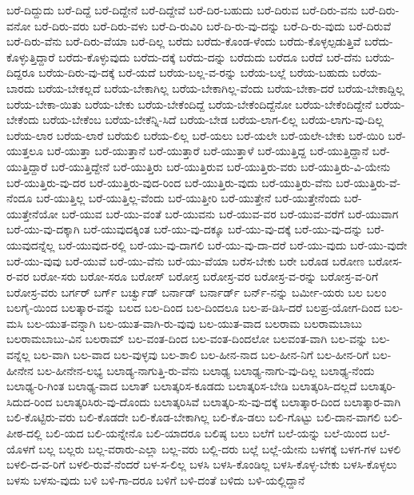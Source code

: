 {ಬರೆ-ದಿದ್ದುದು
ಬರೆ-ದಿದ್ದೆ
ಬರೆ-ದಿದ್ದೇನೆ
ಬರೆ-ದಿದ್ದೇವೆ
ಬರೆ-ದಿರ-ಬಹುದು
ಬರೆ-ದಿರುವ
ಬರೆ-ದಿರು-ವನು
ಬರೆ-ದಿರು-ವನೋ
ಬರೆ-ದಿರು-ವರು
ಬರೆ-ದಿರು-ವಳು
ಬರೆ-ದಿ-ರುವಿರಿ
ಬರೆ-ದಿ-ರು-ವು-ದನ್ನು
ಬರೆ-ದಿ-ರು-ವುದು
ಬರೆ-ದಿರುವೆ
ಬರೆ-ದಿರು-ವೆನು
ಬರೆ-ದಿರು-ವೆಯಾ
ಬರೆ-ದಿಲ್ಲ
ಬರೆದು
ಬರೆದು-ಕೊಂಡ-ಳೆಂದು
ಬರೆದು-ಕೊಳ್ಳಲ್ಪಡುತ್ತಿವೆ
ಬರೆದು-ಕೊಳ್ಳುತ್ತಿದ್ದಾರೆ
ಬರೆದು-ಕೊಳ್ಳುವುದು
ಬರೆದು-ದಕ್ಕೆ
ಬರೆದು-ದನ್ನು
ಬರೆದುದು
ಬರೆದೂ
ಬರೆದೆ
ಬರೆ-ದೆನು
ಬರೆಯ-ದಿದ್ದರೂ
ಬರೆಯ-ದಿರು-ವು-ದಕ್ಕೆ
ಬರೆ-ಯದೆ
ಬರೆಯ-ಬಲ್ಲ-ವ-ರನ್ನು
ಬರೆಯ-ಬಲ್ಲೆ
ಬರೆಯ-ಬಹುದು
ಬರೆಯ-ಬಾರದು
ಬರೆಯ-ಬೇಕಲ್ಲದೆ
ಬರೆಯ-ಬೇಕಾಗಿಲ್ಲ
ಬರೆಯ-ಬೇಕಾಗಿಲ್ಲ-ವೆಂದು
ಬರೆಯ-ಬೇಕಾ-ದರೆ
ಬರೆಯ-ಬೇಕಾದ್ದಿಲ್ಲ
ಬರೆಯ-ಬೇಕಾ-ಯಿತು
ಬರೆಯ-ಬೇಕು
ಬರೆಯ-ಬೇಕೆಂದಿದ್ದೆ
ಬರೆಯ-ಬೇಕೆಂದಿದ್ದೆನೋ
ಬರೆಯ-ಬೇಕೆಂದಿದ್ದೇನೆ
ಬರೆಯ-ಬೇಕೆಂದು
ಬರೆಯ-ಬೇಕೆಂಬ
ಬರೆಯ-ಬೇಕೆನ್ನಿ-ಸಿದೆ
ಬರೆಯ-ಬೇಡ
ಬರೆಯ-ಲಾಗ-ಲಿಲ್ಲ
ಬರೆಯ-ಲಾಗು-ವು-ದಿಲ್ಲ
ಬರೆಯ-ಲಾರ
ಬರೆಯ-ಲಾರೆ
ಬರೆಯಲಿ
ಬರೆಯ-ಲಿಲ್ಲ
ಬರೆ-ಯಲು
ಬರೆ-ಯಲೇ
ಬರೆ-ಯಲೇ-ಬೇಕು
ಬರೆ-ಯಿರಿ
ಬರೆ-ಯುತ್ತಲೂ
ಬರೆ-ಯುತ್ತಾ
ಬರೆ-ಯುತ್ತಾನೆ
ಬರೆ-ಯುತ್ತಾರೆ
ಬರೆ-ಯುತ್ತಾಳೆ
ಬರೆ-ಯುತ್ತಿದ್ದ
ಬರೆ-ಯುತ್ತಿದ್ದಾನೆ
ಬರೆ-ಯುತ್ತಿದ್ದಾರೆ
ಬರೆ-ಯುತ್ತಿದ್ದೇನೆ
ಬರೆ-ಯುತ್ತಿರು
ಬರೆ-ಯುತ್ತಿರುವ
ಬರೆ-ಯುತ್ತಿರು-ವರು
ಬರೆ-ಯುತ್ತಿರು-ವಿ-ಯೇನು
ಬರೆ-ಯುತ್ತಿರು-ವು-ದರ
ಬರೆ-ಯುತ್ತಿರು-ವುದ-ರಿಂದ
ಬರೆ-ಯುತ್ತಿರು-ವುದು
ಬರೆ-ಯುತ್ತಿರು-ವೆನು
ಬರೆ-ಯುತ್ತಿರು-ವೆ-ನೆಂದೂ
ಬರೆ-ಯುತ್ತಿಲ್ಲ
ಬರೆ-ಯುತ್ತಿಲ್ಲ-ವೆಂದು
ಬರೆ-ಯುತ್ತೀರಿ
ಬರೆ-ಯುತ್ತೇನೆ
ಬರೆ-ಯುತ್ತೇನೆಂದು
ಬರೆ-ಯುತ್ತೇನೆಯೋ
ಬರೆ-ಯುವ
ಬರೆ-ಯು-ವಂತೆ
ಬರೆ-ಯುವನು
ಬರೆ-ಯುವ-ವರ
ಬರೆ-ಯುವ-ವರೆಗೆ
ಬರೆ-ಯುವಾಗ
ಬರೆ-ಯು-ವು-ದಕ್ಕಾಗಿ
ಬರೆ-ಯುವುದಕ್ಕಿಂತ
ಬರೆ-ಯು-ವು-ದಕ್ಕೂ
ಬರೆ-ಯು-ವು-ದಕ್ಕೆ
ಬರೆ-ಯು-ವು-ದನ್ನು
ಬರೆ-ಯುವುದನ್ನೆಲ್ಲ
ಬರೆ-ಯುವುದ-ರಲ್ಲಿ
ಬರೆ-ಯು-ವು-ದಾಗಲಿ
ಬರೆ-ಯು-ವು-ದಾ-ದರೆ
ಬರೆ-ಯು-ವುದು
ಬರೆ-ಯು-ವುದೇ
ಬರೆ-ಯು-ವುವು
ಬರೆ-ಯುವೆ
ಬರೆ-ಯು-ವೆನು
ಬರೆ-ಯು-ವೆಯಾ
ಬರೆಸ-ಬೇಕು
ಬರೇ
ಬರೊಡ
ಬರೋಣ
ಬರೋಸ-ರ-ವರ
ಬರೋ-ಸರು
ಬರೋ-ಸರೂ
ಬರೋಸ್
ಬರೋಸ್ರ
ಬರೋಸ್ರ-ವರ
ಬರೋಸ್ರ-ವ-ರನ್ನು
ಬರೋಸ್ರ-ವ-ರಿಗೆ
ಬರೋಸ್ರ-ವರು
ಬರ್ಗರ್
ಬರ್ಗ್
ಬರ್ಚ್ವುಡ್
ಬರ್ನಾಡ್
ಬರ್ನಾರ್ಡ್
ಬರ್ನ್-ನನ್ನು
ಬರ್ಮೀ-ಯರು
ಬಲ
ಬಲಂ
ಬಲಗೈ-ಯಿಂದ
ಬಲತ್ಕಾರ-ವನ್ನು
ಬಲದ
ಬಲ-ದಿಂದ
ಬಲ-ದಿಂದಲೂ
ಬಲ-ಪ-ಡಿಸಿ-ದರೆ
ಬಲಪ್ರ-ಯೋಗ-ದಿಂದ
ಬಲ-ಮಸಿ
ಬಲ-ಯುತ-ವನ್ನಾಗಿ
ಬಲ-ಯುತ-ವಾಗಿ-ರು-ವುವು
ಬಲ-ಯುತ-ವಾದ
ಬಲರಾಮ
ಬಲರಾಮಬಾಬು
ಬಲರಾಮಬಾಬು-ವಿನ
ಬಲರಾಮ್
ಬಲ-ವಂತ-ದಿಂದ
ಬಲ-ವಂತ-ದಿಂದಲೋ
ಬಲವಂತ-ವಾಗಿ
ಬಲ-ವನ್ನು
ಬಲ-ವನ್ನೆಲ್ಲ
ಬಲ-ವಾಗಿ
ಬಲ-ವಾದ
ಬಲ-ವುಳ್ಳವು
ಬಲ-ಶಾಲಿ
ಬಲ-ಹೀನ-ನಾದ
ಬಲ-ಹೀನ-ನಿಗೆ
ಬಲ-ಹೀನ-ರಿಗೆ
ಬಲ-ಹೀನೇನ
ಬಲ-ಹೀನೇನ-ಲಭ್ಯ
ಬಲಾಡ್ಯ-ನಾಗುತ್ತಿ-ರು-ವೆನು
ಬಲಾಢ್ಯ
ಬಲಾಢ್ಯ-ನಾಗು-ವು-ದಿಲ್ಲ
ಬಲಾಢ್ಯ-ನೆಂದು
ಬಲಾಢ್ಯ-ರಿ-ಗಿಂತ
ಬಲಾಢ್ಯ-ವಾದ
ಬಲಾತ್
ಬಲಾತ್ಕರಿಸ-ಕೂಡದು
ಬಲಾತ್ಕರಿಸ-ಬೇಡಿ
ಬಲಾತ್ಕರಿಸಿ-ದಲ್ಲದೆ
ಬಲಾತ್ಕರಿ-ಸಿದುದ-ರಿಂದ
ಬಲಾತ್ಕರಿಸಿರು-ವು-ದೊಂದು
ಬಲಾತ್ಕರಿಸಿವೆ
ಬಲಾತ್ಕರಿ-ಸು-ವು-ದಕ್ಕೆ
ಬಲಾತ್ಕಾರ-ದಿಂದ
ಬಲಾತ್ಕಾರ-ವಾಗಿ
ಬಲಿ-ಕೊಟ್ಟಿರು-ವರು
ಬಲಿ-ಕೊಡದೇ
ಬಲಿ-ಕೊಡ-ಬೇಕಾಗಿಲ್ಲ
ಬಲಿ-ಕೊ-ಡಲು
ಬಲಿ-ಗೊಟ್ಟು
ಬಲಿ-ದಾನ-ವಾಗಲಿ
ಬಲಿ-ಪೀಠ-ದಲ್ಲಿ
ಬಲಿ-ಯದ
ಬಲಿ-ಯನ್ನೇನೊ
ಬಲಿ-ಯಾದರೂ
ಬಲಿಷ್ಠ
ಬಲು
ಬಲೆಗೆ
ಬಲೆ-ಯನ್ನು
ಬಲೆ-ಯಿಂದ
ಬಲೆ-ಯೊಳಗೆ
ಬಲ್ಲ
ಬಲ್ಲರು
ಬಲ್ಲ-ವರಾರು-ಎಲ್ಲಾ
ಬಲ್ಲ-ವರು
ಬಲ್ಲಿ-ದರು
ಬಲ್ಲೆ
ಬಲ್ಲೆ-ಯೇನು
ಬಳಗಕ್ಕೆ
ಬಳಗ-ಗಳ
ಬಳಲಿ
ಬಳಲಿ-ದ-ವ-ರಿಗೆ
ಬಳಲಿ-ರುವೆ-ನೆಂದರೆ
ಬಳ-ಸ-ಲಿಲ್ಲ
ಬಳಸಿ
ಬಳಸಿ-ಕೊಂಡಿಲ್ಲ
ಬಳಸಿ-ಕೊಳ್ಳ-ಬೇಕು
ಬಳಸಿ-ಕೊಳ್ಳಲು
ಬಳಸು
ಬಳಸು-ವುದು
ಬಳಿ
ಬಳಿ-ಗಾ-ದರೂ
ಬಳಿಗೆ
ಬಳಿ-ದಂತೆ
ಬಳಿದು
ಬಳಿ-ಯಲ್ಲಿದ್ದಾನೆ
}
